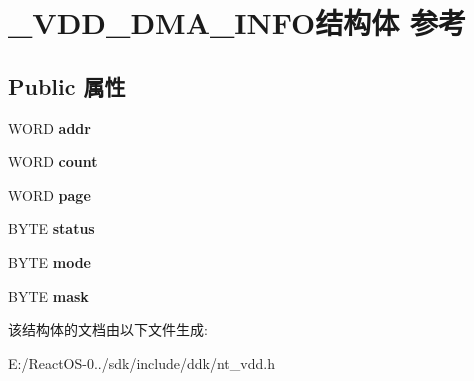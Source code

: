 \hypertarget{struct___v_d_d___d_m_a___i_n_f_o}{}\section{\+\_\+\+V\+D\+D\+\_\+\+D\+M\+A\+\_\+\+I\+N\+F\+O结构体 参考}
\label{struct___v_d_d___d_m_a___i_n_f_o}
\subsection*{Public 属性}
\begin{DoxyCompactItemize}
\item 
\mbox{\label{struct___v_d_d___d_m_a___i_n_f_o_a48278ae32973813f866926d390bf3647}} 
W\+O\+RD {\bfseries addr}
\item 
\mbox{\label{struct___v_d_d___d_m_a___i_n_f_o_aa087d93117d3232a66e5b78ab6eea18a}} 
W\+O\+RD {\bfseries count}
\item 
\mbox{\label{struct___v_d_d___d_m_a___i_n_f_o_abdc0acb2da96081660f87088240333ae}} 
W\+O\+RD {\bfseries page}
\item 
\mbox{\label{struct___v_d_d___d_m_a___i_n_f_o_a0597dc33351f1c03f048d7dc7ff5bfa4}} 
B\+Y\+TE {\bfseries status}
\item 
\mbox{\label{struct___v_d_d___d_m_a___i_n_f_o_ae94e78e843df07d10ea8cc0627d270e3}} 
B\+Y\+TE {\bfseries mode}
\item 
\mbox{\label{struct___v_d_d___d_m_a___i_n_f_o_a7b6ba7653605a0f5c5bca9803e6429e0}} 
B\+Y\+TE {\bfseries mask}
\end{DoxyCompactItemize}


该结构体的文档由以下文件生成\+:\begin{DoxyCompactItemize}
\item 
E\+:/\+React\+O\+S-\/0../sdk/include/ddk/nt\+\_\+vdd.\+h\end{DoxyCompactItemize}
